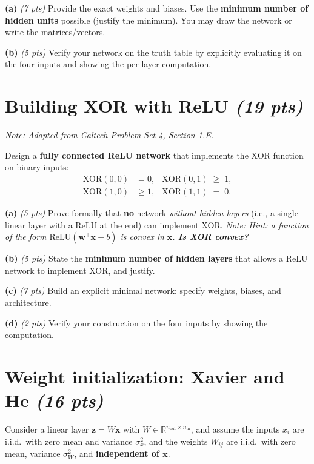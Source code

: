 \documentclass[11pt,letterpaper]{article}
\newcommand{\R}{\mathbb{R}}
\newcommand{\relu}{\mathrm{ReLU}}
\newcommand{\pts}[1]{\textit{(#1 pts)}\;}
\newcommand{\note}[1]{\textit{\small Note: #1}}
\begin{document}
\textbf{(a)} \pts{7} Provide the exact weights and biases. Use the
\textbf{minimum number of hidden units} possible (justify the minimum). You may
draw the network or write the matrices/vectors.

\textbf{(b)} \pts{5} Verify your network on the truth table by explicitly
evaluating it on the four inputs and showing the per-layer computation.

\section{Building XOR with ReLU \pts{19}}

\note{Adapted from Caltech Problem Set 4, Section 1.E.}

Design a \textbf{fully connected ReLU network} that implements the XOR
function on binary inputs:
$$
\begin{aligned}
\text{XOR}(0,0) &= 0, & \text{XOR}(0,1) \;\geq\; 1, \\
\text{XOR}(1,0) &\geq 1, & \text{XOR}(1,1) \;=\; 0.
\end{aligned}
$$

\textbf{(a)} \pts{5} Prove formally that \textbf{no} network \emph{without
hidden layers} (i.e., a single linear layer with a ReLU at the end) can
implement XOR.
\note{Hint: a function of the form $\relu(\mathbf{w}^\top \mathbf{x} + b)$ is
convex in $\mathbf{x}$. \textbf{Is XOR convex?}}

\textbf{(b)} \pts{5} State the \textbf{minimum number of hidden layers} that
allows a ReLU network to implement XOR, and justify.

\textbf{(c)} \pts{7} Build an explicit minimal network: specify weights,
biases, and architecture.

\textbf{(d)} \pts{2} Verify your construction on the four inputs by showing
the computation.

\section{Weight initialization: Xavier and He \pts{16}}

Consider a linear layer $\mathbf{z} = W \mathbf{x}$ with
$W \in \R^{n_{\text{out}} \times n_{\text{in}}}$, and assume the inputs $x_i$
are i.i.d.~with zero mean and variance $\sigma_x^2$, and the weights $W_{ij}$
are i.i.d.~with zero mean, variance $\sigma_W^2$, and \textbf{independent of
$\mathbf{x}$}.
\end{document}
